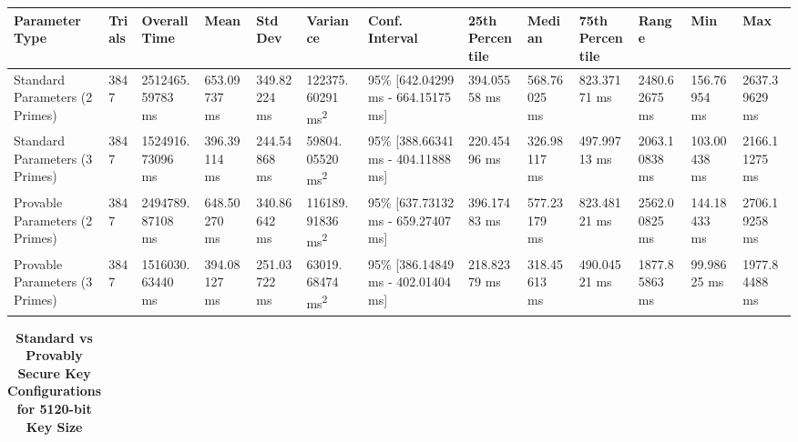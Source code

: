 \documentclass[]{final_report}
\theoremstyle{definition}
\begin{document}
\begin{landscape}
\begin{table}[H]
\begin{tabular}{|p{2.5cm}|p{1cm}|p{1.5cm}|p{1.5cm}|p{1.5cm}|p{1.5cm}|p{2.5cm}|p{1.5cm}|p{1.5cm}|p{1.5cm}|p{1.5cm}|p{1.5cm}|p{1.65cm}|}
\hline
\textbf{Parameter Type} & \textbf{Trials} & \textbf{Overall Time} & \textbf{Mean} & \textbf{Std Dev} & \textbf{Variance} & \textbf{Conf. Interval} & \textbf{25th Percentile} & \textbf{Median} & \textbf{75th Percentile} & \textbf{Range} & \textbf{Min} & \textbf{Max} \\
\hline
Standard Parameters (2 Primes) & 3847 & 2512465.
59783 ms & 653.09737 ms & 349.82224 ms & 122375.
60291 ms\textsuperscript{2} & 95\% [642.04299 ms - 664.15175 ms] & 394.05558 ms & 568.76025 ms & 823.37171 ms & 2480.62675 ms & 156.76954 ms & 2637.39629 ms \\
\hline
Standard Parameters (3 Primes) & 3847 & 1524916.
73096 ms & 396.39114 ms & 244.54868 ms & 59804.
05520 ms\textsuperscript{2} & 95\% [388.66341 ms - 404.11888 ms] & 220.45496 ms & 326.98117 ms & 497.99713 ms & 2063.10838 ms & 103.00438 ms & 2166.11275 ms \\
\hline
Provable Parameters (2 Primes) & 3847 & 2494789.
87108 ms & 648.50270 ms & 340.86642 ms & 116189.
91836 ms\textsuperscript{2} & 95\% [637.73132 ms - 659.27407 ms] & 396.17483 ms & 577.23179 ms & 823.48121 ms & 2562.00825 ms & 144.18433 ms & 2706.19258 ms \\
\hline
Provable Parameters (3 Primes) & 3847 & 1516030.
63440 ms & 394.08127 ms & 251.03722 ms & 63019.
68474 ms\textsuperscript{2} & 95\% [386.14849 ms - 402.01404 ms] & 218.82379 ms & 318.45613 ms & 490.04521 ms & 1877.85863 ms & 99.98625 ms & 1977.84488 ms \\
\hline
\end{tabular}
\label{keyGen_4096bit_table}
\end{table}

\begin{table}[H]
\caption{\textbf{Standard vs Provably Secure Key Configurations for 5120-bit Key Size}}
\centering

\begin{tabular}{|p{2.5cm}|p{1cm}|p{1.5cm}|p{1.5cm}|p{1.5cm}|p{1.5cm}|p{2.5cm}|p{1.5cm}|p{1.75cm}|p{1.6cm}|p{1.5cm}|p{1.5cm}|p{1.55cm}|}


\end{tabular}
\end{table}
\end{landscape}
\end{document}
